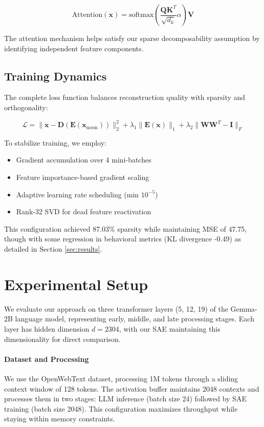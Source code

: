 \documentclass{article} %
\begin{document}
\begin{equation}
    \text{Attention}(\mathbf{x}) = \text{softmax}\left(\frac{\mathbf{Q}\mathbf{K}^T}{\sqrt{d_k}}\alpha\right)\mathbf{V}
\end{equation}

The attention mechanism helps satisfy our sparse decomposability assumption by identifying independent feature components.

\subsection{Training Dynamics}
The complete loss function balances reconstruction quality with sparsity and orthogonality:

\begin{equation}
    \mathcal{L} = \|\mathbf{x} - \mathbf{D}(\mathbf{E}(\mathbf{x}_{\text{norm}}))\|_2^2 + \lambda_1\|\mathbf{E}(\mathbf{x})\|_1 + \lambda_2\|\mathbf{W}\mathbf{W}^T - \mathbf{I}\|_F
\end{equation}

To stabilize training, we employ:
\begin{itemize}
    \item Gradient accumulation over 4 mini-batches
    \item Feature importance-based gradient scaling
    \item Adaptive learning rate scheduling (min $10^{-5}$)
    \item Rank-32 SVD for dead feature reactivation
\end{itemize}

This configuration achieved 87.03\% sparsity while maintaining MSE of 47.75, though with some regression in behavioral metrics (KL divergence -0.49) as detailed in Section \ref{sec:results}.

\section{Experimental Setup}
\label{sec:experimental}

We evaluate our approach on three transformer layers (5, 12, 19) of the Gemma-2B language model, representing early, middle, and late processing stages. Each layer has hidden dimension $d=2304$, with our SAE maintaining this dimensionality for direct comparison.

\paragraph{Dataset and Processing} We use the OpenWebText dataset, processing 1M tokens through a sliding context window of 128 tokens. The activation buffer maintains 2048 contexts and processes them in two stages: LLM inference (batch size 24) followed by SAE training (batch size 2048). This configuration maximizes throughput while staying within memory constraints.
\end{document}
